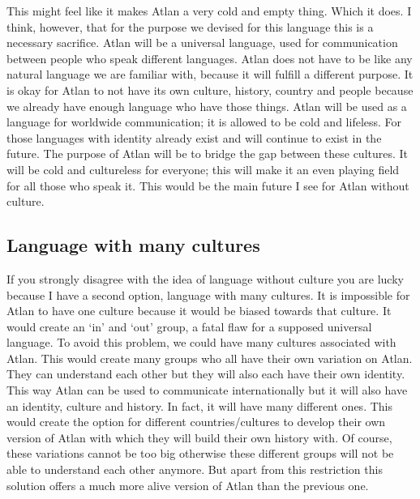 This might feel like it makes Atlan a very cold and empty thing. Which it does. I think, however, that for the purpose we devised for this language this is a necessary sacrifice. Atlan will be a universal language, used for communication between people who speak different languages. Atlan does not have to be like any natural language we are familiar with, because it will fulfill a different purpose. It is okay for Atlan to not have its own culture, history, country and people because we already have enough language who have those things. Atlan will be used as a language for worldwide communication; it is allowed to be cold and lifeless. For those languages with identity already exist and will continue to exist in the future. The purpose of Atlan will be to bridge the gap between these cultures. It will be cold and cultureless for everyone; this will make it an even playing field for all those who speak it. This would be the main future I see for Atlan without culture.  

\subsection{Language with many cultures} 

If you strongly disagree with the idea of language without culture you are lucky because I have a second option, language with many cultures. It is impossible for Atlan to have one culture because it would be biased towards that culture. It would create an ‘in’ and ‘out’ group, a fatal flaw for a supposed universal language. To avoid this problem, we could have many cultures associated with Atlan. This would create many groups who all have their own variation on Atlan. They can understand each other but they will also each have their own identity. This way Atlan can be used to communicate internationally but it will also have an identity, culture and history. In fact, it will have many different ones. This would create the option for different countries/cultures to develop their own version of Atlan with which they will build their own history with. Of course, these variations cannot be too big otherwise these different groups will not be able to understand each other anymore. But apart from this restriction this solution offers a much more alive version of Atlan than the previous one.  

